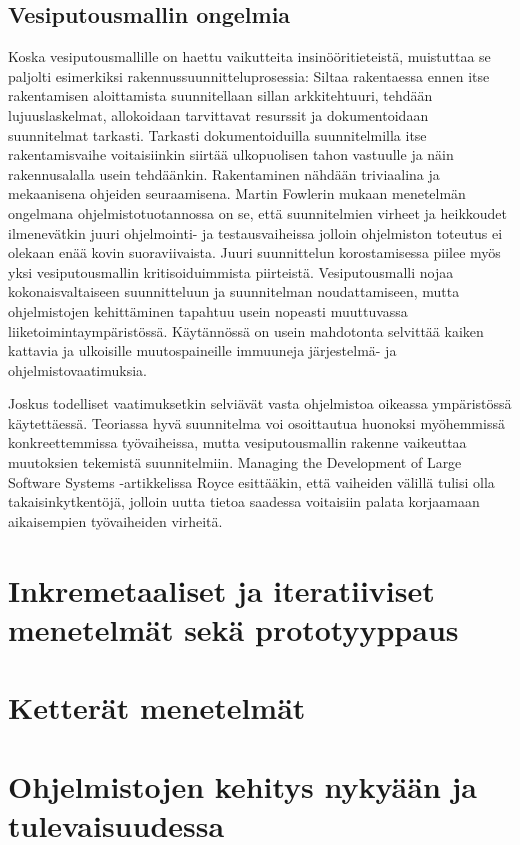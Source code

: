 \documentclass[finnish,12pt]{tktltiki2}
\theoremstyle{definition}
\theoremstyle{remark}
\begin{document}
\subsection{Vesiputousmallin ongelmia}

Koska vesiputousmallille on haettu vaikutteita insinööritieteistä, muistuttaa se paljolti esimerkiksi rakennussuunnitteluprosessia: Siltaa rakentaessa ennen itse rakentamisen aloittamista suunnitellaan sillan arkkitehtuuri, tehdään lujuuslaskelmat, allokoidaan tarvittavat resurssit ja dokumentoidaan suunnitelmat tarkasti. Tarkasti dokumentoiduilla suunnitelmilla itse rakentamisvaihe voitaisiinkin siirtää ulkopuolisen tahon vastuulle ja näin rakennusalalla usein tehdäänkin. \cite{Fowler05} Rakentaminen nähdään triviaalina ja mekaanisena ohjeiden seuraamisena. Martin Fowlerin mukaan menetelmän ongelmana ohjelmistotuotannossa on se, että suunnitelmien virheet ja heikkoudet ilmenevätkin juuri ohjelmointi- ja testausvaiheissa jolloin ohjelmiston toteutus ei olekaan enää kovin suoraviivaista. Juuri suunnittelun korostamisessa piilee myös yksi vesiputousmallin kritisoiduimmista piirteistä. Vesiputousmalli nojaa kokonaisvaltaiseen suunnitteluun ja suunnitelman noudattamiseen, mutta ohjelmistojen kehittäminen tapahtuu usein nopeasti muuttuvassa liiketoimintaympäristössä. Käytännössä on usein mahdotonta selvittää kaiken kattavia ja ulkoisille muutospaineille immuuneja järjestelmä- ja ohjelmistovaatimuksia. \cite{Sommerville10} 

Joskus todelliset vaatimuksetkin selviävät vasta ohjelmistoa oikeassa ympäristössä käytettäessä. Teoriassa hyvä suunnitelma voi osoittautua huonoksi myöhemmissä konkreettemmissa työvaiheissa, mutta vesiputousmallin rakenne vaikeuttaa muutoksien tekemistä suunnitelmiin. Managing the Development of Large Software Systems -artikkelissa Royce esittääkin, että vaiheiden välillä tulisi olla takaisinkytkentöjä, jolloin uutta tietoa saadessa voitaisiin palata korjaamaan aikaisempien työvaiheiden virheitä. \cite{Royce1970} 


\section{Inkremetaaliset ja iteratiiviset menetelmät sekä prototyyppaus}
\section{Ketterät menetelmät}
\section{Ohjelmistojen kehitys nykyään ja tulevaisuudessa}
\end{document}
